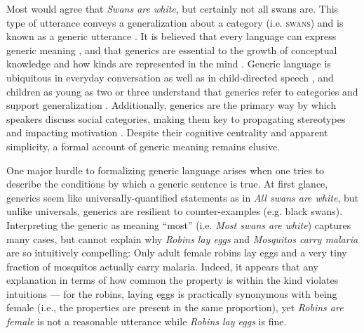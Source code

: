 \documentclass[10pt,letterpaper]{article}
\begin{document}
Most would agree that \emph{Swans are white}, but certainly not all swans are.
This type of utterance conveys a generalization about a category (i.e. \textsc{swans}) and is known as a generic utterance \cite{Carlson1977, Leslie2008}.
It is believed that every language can express generic meaning \cite{Behrens2005, Carlson1995}, and that generics are essential to the growth of conceptual knowledge \cite{Gelman2004} and how kinds are represented in the mind \cite{Leslie2008}.
Generic language is ubiquitous in everyday conversation as well as in child-directed speech \cite{Gelman2008}, and children as young as two or three understand that generics refer to categories and support generalization \cite{Cimpian2008}.
Additionally, generics are the primary way by which speakers discuss social categories, making them key to propagating stereotypes \cite{GelmanEtAl2004, Rhodes2012, Leslie2015} and impacting motivation \cite{Cimpian2010motivation}.
Despite their cognitive centrality and apparent simplicity, a formal account of generic meaning remains elusive.

One major hurdle to formalizing generic language arises when one tries to describe the conditions by which a generic sentence is true.
At first glance, generics seem like universally-quantified statements as in \emph{All swans are white}, but unlike universals, generics are resilient to counter-examples (e.g. black swans). 
Interpreting the generic as meaning ``most'' (i.e. \emph{Most swans are white}) captures many cases, but cannot explain why \emph{Robins lay eggs} and \emph{Mosquitos carry malaria} are so intuitively compelling: Only adult female robins lay eggs and a very tiny fraction of mosquitos actually carry malaria.
Indeed, it appears that any explanation in terms of how common the property is within the kind violates intuitions --- for the robins, laying eggs is practically synonymous with being female (i.e., the properties are present in the same proportion), yet \emph{Robins are female} is not a reasonable utterance while \emph{Robins lay eggs} is fine.
\end{document}
